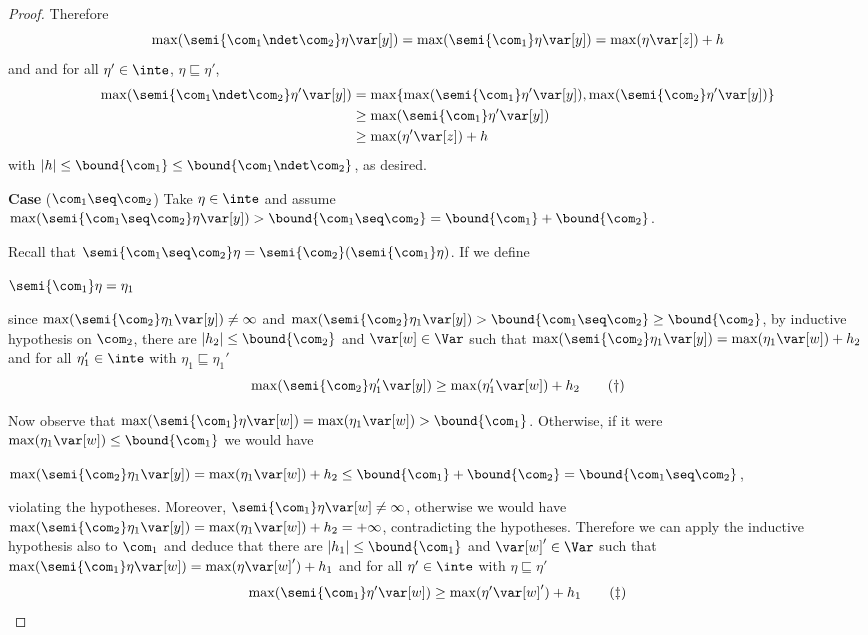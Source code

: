 \begin{proof}
  Therefore 
  \[
  \max(\semi{\com_1 \ndet \com_2}\eta \var[y])
  = \max(\semi{\com_1}\eta \var[y]) = \max(\eta \var[z]) + h
  \]
  and and for
  all \(\eta' \in \inte\), \(\eta \sqsubseteq \eta'\),
  \begin{align*}
    \max(\semi{\com_1 \ndet \com_2}\eta' \var[y])
    &= \max\{ \max(\semi{\com_1}\eta' \var[y]),  \max(\semi{\com_2}\eta' \var[y])\}\\
    & \geq \max(\semi{\com_1}\eta' \var[y])\\
    & \geq \max(\eta' \var[z]) + h
  \end{align*}
  with \(|h| \leq \bound{\com_1} \leq \bound{\com_1 \ndet \com_2}\), as desired.

  
  \medskip
  
  \noindent
  \textbf{Case} (\(\com_1 \seq \com_2\))
  Take \(\eta \in \inte\) and assume
  \(\max(\semi{\com_1 \seq \com_2}\eta\var[y]) > \bound{\com_1 \seq
    \com_2} = \bound{\com_1} + \bound{\com_2}\).
  
  Recall that
  \(\semi{\com_1 \seq \com_2} \eta = \semi{\com_2}(\semi{\com_1}\eta)\).
  If we define
  \begin{center}
    \(\semi{\com_1} \eta = \eta_1\)
  \end{center}
  since \(\max(\semi{\com_2}\eta_1 \var[y]) \neq \infty\) and
  \(\max(\semi{\com_2} \eta_1 \var[y]) > \bound{\com_1 \seq \com_2}
  \geq \bound{\com_2}\), by inductive hypothesis on \(\com_2\), there
  are \(|h_2| \leq \bound{\com_2}\) and \(\var[w] \in \Var\) such that
  \(\max(\semi{\com_2} \eta_1 \var[y]) = \max(\eta_1 \var[w]) + h_2\)
  and for all \(\eta_1' \in \inte\) with
  \(\eta_1 \sqsubseteq \eta_1'\)
  \begin{equation}
    \label{eq:seq2}
    \max(\semi{\com_2} \eta_1' \var[y]) \geq \max(\eta_1' \var[w]) + h_2
    \tag{\dag}
  \end{equation}
  
  Now observe that
  \(\max(\semi{\com_1}\eta \var[w]) = \max(\eta_1 \var[w]) >
  \bound{\com_1}\). Otherwise, if it were \(\max(\eta_1 \var[w]) \leq
  \bound{\com_1}\) we would have
  \begin{center}
    \(\max(\semi{\com_2}\eta_1 \var[y]) = \max(\eta_1 \var[w]) + h_2 \leq
    \bound{\com_1} + \bound{\com_2} = \bound{\com_1 \seq \com_2}\),
  \end{center}
  violating the hypotheses. Moreover,
  \(\semi{\com_1}\eta \var[w] \neq \infty\), otherwise we would have
  \(\max(\semi{\com_2} \eta_1 \var[y]) = \max(\eta_1 \var[w]) + h_2 =
  + \infty\), contradicting the hypotheses.  Therefore we can apply
  the inductive hypothesis also to \(\com_1\) and deduce that there
  are \(|h_1| \leq \bound{\com_1}\) and \(\var[w]' \in \Var\) such
  that
  \(\max(\semi{\com_1} \eta \var[w]) = \max(\eta \var[w]') + h_1\) and
  for all \(\eta' \in \inte\) with \(\eta \sqsubseteq \eta'\)
  \begin{equation}
    \label{eq:seq1}
    \max(\semi{\com_1} \eta' \var[w]) \geq \max(\eta' \var[w]') + h_1
    \tag{\ddag}
  \end{equation}


\end{proof}
